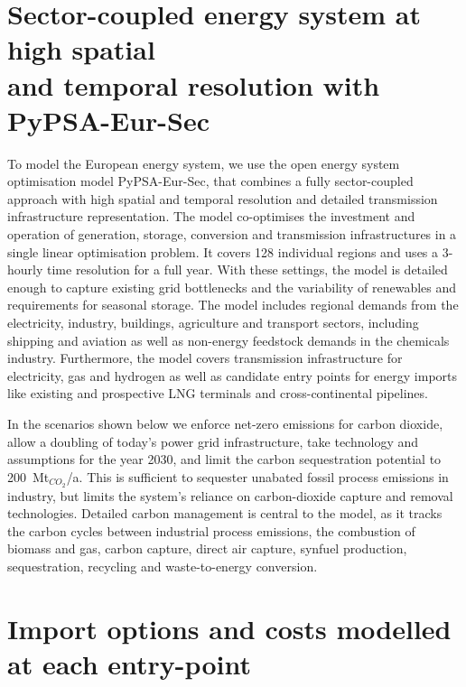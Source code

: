 \documentclass[10pt,5p,reversenotenum,lefttitle]{elsarticle}
\begin{document}
\section*{Sector-coupled energy system at high spatial\\and temporal resolution with PyPSA-Eur-Sec}

To model the European energy system, we use the open energy system
optimisation model PyPSA-Eur-Sec,\cite{PyPSAEurSecSectorCoupled} that combines a
fully sector-coupled approach with high spatial and temporal resolution and
detailed transmission infrastructure representation. The model co-optimises the
investment and operation of generation, storage, conversion and transmission
infrastructures in a single linear optimisation problem. It covers 128
individual regions and uses a 3-hourly time resolution for a full year. With
these settings, the model is detailed enough to capture existing grid
bottlenecks and the variability of renewables and requirements for seasonal
storage. The model includes regional demands from the electricity, industry,
buildings, agriculture and transport sectors, including shipping and aviation as
well as non-energy feedstock demands in the chemicals industry. Furthermore, the
model covers transmission infrastructure for electricity, gas and hydrogen as
well as candidate entry points for energy imports like existing and prospective
LNG terminals and cross-continental pipelines. 

In the scenarios shown below we enforce net-zero emissions for carbon dioxide,
allow a doubling of today's power grid infrastructure, take technology and
assumptions for the year 2030\cite{dea2019}, and limit the carbon sequestration
potential to 200~Mt$_{CO_2}$/a. This is sufficient to sequester unabated fossil process
emissions in industry, but limits the system's reliance on carbon-dioxide
capture and removal technologies. Detailed carbon management is central to the model, as it
tracks the carbon cycles between industrial process emissions, the combustion of
biomass and gas, carbon capture, direct air capture, synfuel production,
sequestration, recycling and waste-to-energy conversion. 

\section*{Import options and costs modelled at each entry-point}
\end{document}
